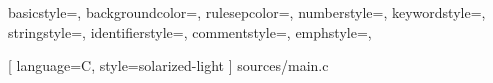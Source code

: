 {
	basicstyle=\footnotesize\ttfamily\color{solarized@base00},
	backgroundcolor=\color{solarized@base3},
	rulesepcolor=\color{solarized@base3},
	numberstyle=\tiny\color{solarized@base1},
	keywordstyle=\color{solarized@green},
	stringstyle=\color{solarized@cyan}\ttfamily,
	identifierstyle=\color{solarized@blue},
	commentstyle=\color{solarized@base1},
	emphstyle=\color{solarized@red},
}



[
	language=C,
	style=solarized-light
] {sources/main.c}

